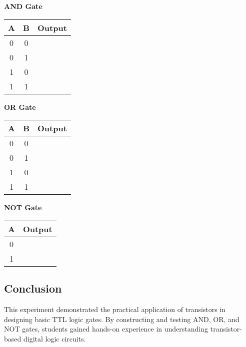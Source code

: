 \noindent \textbf{AND Gate}
\begin{table}[h]
    \centering
    \begin{tabular}{c|c|c}
        \hline
        A & B & Output \\ \hline \hline
        0   & 0  &   \\ \hline
        0   & 1   &    \\ \hline
        1  & 0   &    \\ \hline
        1  & 1  &   \\ \hline
    \end{tabular}
    \label{tab:and_gate}
\end{table}

\noindent \textbf{OR Gate}
\begin{table}[h]
    \centering
    \begin{tabular}{c|c|c}
        \hline
        A & B & Output \\ \hline \hline
        0   & 0  &   \\ \hline
        0   & 1   &    \\ \hline
        1  & 0   &    \\ \hline
        1  & 1  &   \\ \hline
    \end{tabular}
    \label{tab:or_gate}
\end{table}

\noindent \textbf{NOT Gate}
\begin{table}[h]
    \centering
    \begin{tabular}{c|c}
        \hline
        A  & Output \\ \hline \hline
        0   &      \\ \hline
        1  &        \\ \hline

    \end{tabular}
    \label{tab:not_gate}
\end{table}

\subsection*{Conclusion}
This experiment demonstrated the practical application of transistors in designing basic TTL logic gates. By constructing and testing AND, OR, and NOT gates, students gained hands-on experience in understanding transistor-based digital logic circuits.

\newpage